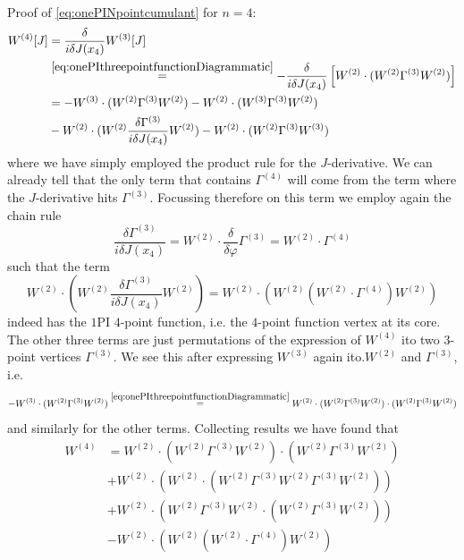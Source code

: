 \\
Proof of \ref{eq:onePINpointcumulant} for $n=4$:
\begin{align*}
	W^{(4)}[J] &= \frac{\delta}{i\delta J(x_4)} W^{(3)}[J] \\
	&\stackrel{\ref{eq:onePIthreepointfunctionDiagrammatic}}{=} - \frac{\delta}{i \delta J(x_4)} \left[W^{(2)} \cdot (W^{(2)} \Gamma^{(3)} W^{(2)})\right]\\
	&=- W^{(3)} \cdot (W^{(2)} \Gamma^{(3)} W^{(2)})-W^{(2)}\cdot (W^{(3)}\Gamma^{(3)}W^{(2)})\\
	&-W^{(2)} \cdot (W^{(2)} \frac{\delta \Gamma^{(3)}}{i\delta J(x_4)} W^{(2)}) - W^{(2)} \cdot (W^{(2)} \Gamma^{(3)} W^{(3)})
	\end{align*}
	where we have simply employed the product rule for the $J$-derivative. We can already tell that the only term that contains $\Gamma^{(4)}$ will come from the term where the $J$-derivative hits $\Gamma^{(3)}$. Focussing therefore on this term we employ again the chain rule
\begin{equation*}
	\frac{\delta \Gamma^{(3)}}{i\delta J(x_4)} = W^{(2)} \cdot \frac{\delta}{\delta \varphi} \Gamma^{(3)} = W^{(2)}\cdot \Gamma^{(4)} 
\end{equation*}
such that the term
\begin{equation*}
	W^{(2)} \cdot (W^{(2)} \frac{\delta \Gamma^{(3)}}{i\delta J(x_4)} W^{(2)}) = W^{(2)} \cdot    (W^{(2)} (W^{(2)} \cdot \Gamma^{(4)} ) W^{(2)} )
\end{equation*}
indeed has the $1$PI $4$-point function, i.e. the $4$-point function vertex  at its core.\\
The other three terms are just permutations of the expression of $W^{(4)}$ ito two $3$-point vertices $\Gamma^{(3)}$. We see this after expressing $W^{(3)}$ again ito.$W^{(2)}$ and $\Gamma^{(3)}$, i.e.
\begin{equation*}
	-W^{(3)} \cdot (W^{(2)} \Gamma^{(3)} W^{(2)}) \stackrel{\ref{eq:onePIthreepointfunctionDiagrammatic}}{=} W^{(2)} \cdot (W^{(2)} \Gamma^{(3)} W^{(2)}) \cdot (W^{(2)} \Gamma^{(3)} W^{(2)}) 
\end{equation*}
and similarly for the other terms. Collecting results we have found that
\begin{align*}
	W^{(4)} &= W^{(2)} \cdot (W^{(2)} \Gamma^{(3)} W^{(2)} ) \cdot (W^{(2)} \Gamma^{(3)} W^{(2)}) \\
	&+ W^{(2)} \cdot (W^{(2)} \cdot (W^{(2)} \Gamma^{(3)} W^{(2)} \Gamma^{(3)} W^{(2)} ))\\
	&+ W^{(2)} \cdot (W^{(2)} \Gamma^{(3)} W^{(2)} \cdot (W^{(2)} \Gamma^{(3)} W^{(2)} ))\\
	&- W^{(2)} \cdot (W^{(2)}(W^{(2)} \cdot \Gamma^{(4)} ) W^{(2)})
\end{align*}
